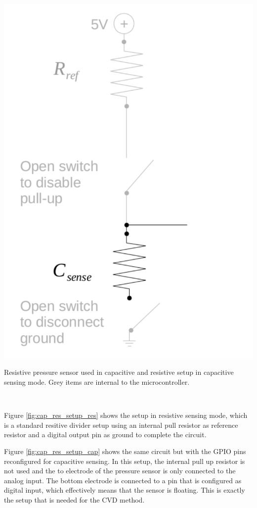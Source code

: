 \documentclass{sigchi-ext}
\begin{document}
\begin{marginfigure}
\begin{minipage}{\marginparwidth}
\centering
\includegraphics[width=0.9\columnwidth]{figures/cap_res_setup_cap}
\caption{Resistive pressure sensor used in capacitive and resistive setup in
capacitive sensing mode. Grey items are internal to the
microcontroller.}~\label{fig:cap_res_setup_cap}
\end{minipage}
\end{marginfigure}

Figure \ref{fig:cap_res_setup_res} shows the setup in resistive sensing mode,
which is a standard resitive divider setup using an internal pull resistor
as reference resistor and a digital output pin as ground to complete the
circuit.

Figure \ref{fig:cap_res_setup_cap} shows the same circuit but with the GPIO pins
reconfigured for capacitive sensing. In this setup, the internal pull up
resistor is not used and the to electrode of the pressure sensor is only
connected to the analog input. The bottom electrode is connected to a pin that
is configured as digital input, which effectively means that the sensor is
floating. This is exactly the setup that is needed for the CVD method.
\end{document}
